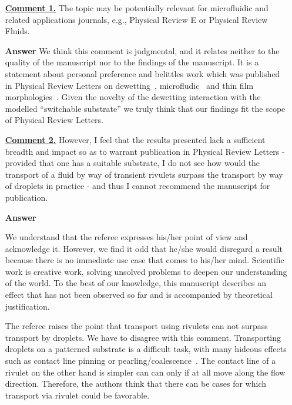 \documentclass[12pt,english]{article}
\begin{document}
\begin{itemize}

\item[ \textbf{\underline{Comment 1.}}]
{ 
The topic may be potentially relevant for microfluidic and related applications journals, e.g., Physical Review E or Physical Review Fluids.
}

\item[ \textbf{{Answer}}]
{ 
We think this comment is judgmental, and it relates neither to the quality of the manuscript nor to the findings of the manuscript.
It is a statement about personal preference and belittles work which was published in Physical Review Letters on dewetting~\cite{fetzer2007thermal}, microfludic~\cite{PhysRevLett.110.048303} and thin film morphologies~\cite{PhysRevLett.84.931}.
Given the novelty of the dewetting interaction with the modelled ``switchable substrate'' we truly think that our findings fit the scope of Physical Review Letters.
}

\item[ \textbf{\underline{Comment 2.}}]
{ 
However, I feel that the results presented lack a sufficient breadth and impact so as to warrant publication in Physical Review Letters - provided that one has a suitable substrate, I do not see how would the transport of a fluid by way of transient rivulets surpass the transport by way of droplets in practice - and thus I cannot recommend the manuscript for publication.
}

\item[ \textbf{{Answer}}]
{ 
We understand that the referee expresses his/her point of view and acknowledge it.
However, we find it odd that he/she would disregard a result because there is no immediate use case that comes to his/her mind.
Scientific work is creative work, solving unsolved problems to deepen our understanding of the world.
To the best of our knowledge, this manuscript describes an effect that has not been observed so far and is accompanied by theoretical justification.

The referee raises the point that transport using rivulets can not surpass transport by droplets.
We have to disagree with this comment.
Transporting droplets on a patterned substrate is a difficult task, with many hideous effects such as contact line pinning or pearling/coalescence~\cite{PhysRevLett.119.204501}.
The contact line of a rivulet on the other hand is simpler can can only if at all move along the flow direction.
Therefore, the authors think that there can be cases for which transport via rivulet could be favorable.

}
\end{itemize}
\end{document}
